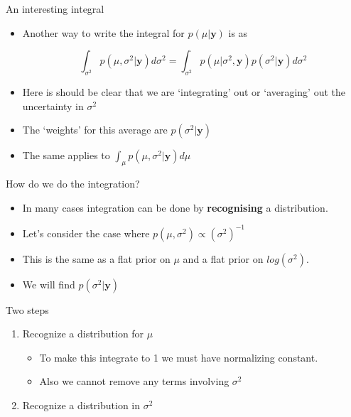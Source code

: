 \documentclass[10pt]{beamer}
\begin{document}
\begin{frame}{An interesting integral}
  \begin{itemize}
  \item Another way to write the integral for $p(\mu|{\bm y})$ is as

    \begin{equation*}
      \int_{\sigma^2}p(\mu,\sigma^2|{\bm y})d\sigma^2=
      \int_{\sigma^2}p(\mu|\sigma^2,{\bm y})p(\sigma^2|{\bm y})d\sigma^2
    \end{equation*}

  \item Here is should be  clear that we are `integrating' out or `averaging' out the uncertainty in $\sigma^2$

  \item The `weights' for this average are $p(\sigma^2|{\bm y})$

  \item The same applies to $\int_{\mu}p(\mu,\sigma^2|{\bm y})d\mu$
  \end{itemize}
\end{frame}
\begin{frame}{How do we do the integration?}
  \begin{itemize}
  \item In many cases integration can be done by {\bf recognising} a distribution.

  \item Let's consider the case where $p(\mu,\sigma^2)\propto (\sigma^2)^{-1}$

  \item This is the same as a flat prior on $\mu$ and a flat prior on $log(\sigma^2)$.

  \item We will find $p(\sigma^2|{\bm y})$
  \end{itemize}
\end{frame}
\begin{frame}{Two steps}
  \begin{enumerate}
  \item Recognize a distribution for $\mu$

    \begin{itemize}
    \item To make this integrate to 1 we must have normalizing constant.
    \item Also we cannot remove any terms involving $\sigma^2$
    \end{itemize}

  \item Recognize a distribution in $\sigma^2$
  \end{enumerate}
\end{frame}
\end{document}
